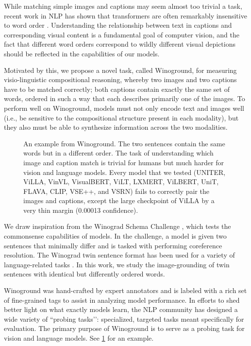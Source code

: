 \documentclass[10pt,twocolumn,letterpaper]{article}
\begin{document}
While matching simple images and captions may seem almost too trivial a task, recent work in NLP has shown that transformers are often remarkably insensitive to word order \cite{sinha2021matterslittle}. Understanding the relationship between text in captions and corresponding visual content is a fundamental goal of computer vision, and the fact that different word orders correspond to wildly different visual depictions should be reflected in the capabilities of our models.

Motivated by this, we propose a novel task, called Winoground, for measuring visio-linguistic compositional reasoning, 
whereby two images and two captions have to be matched correctly; both captions contain exactly the same set of words, ordered in such a way that each describes primarily one of the images. To perform well on Winoground, models must not only encode text and images well (i.e., be sensitive to the compositional structure present in each modality), but they also must be able to synthesize information across the two modalities.

\begin{figure}[!t]\centering
    \qquad
    \caption{An example from Winoground. The two sentences contain the same words but in a different order. The task of understanding which image and caption match is trivial for humans but much harder for vision and language models. Every model that we tested (UNITER, ViLLA, VinVL, VisualBERT, ViLT, LXMERT, ViLBERT, UniT, FLAVA, CLIP, VSE++, and VSRN) fails to correctly pair the images and captions, except the large checkpoint of ViLLA by a very thin margin (0.00013 confidence).}\label{fig:teaser-ex}\end{figure}

We draw inspiration from the Winograd Schema Challenge \cite{levesque2012winograd}, which tests the commonsense capabilities of models. In the challenge, a model is given two sentences that minimally differ and is tasked with performing coreference resolution. The Winograd twin sentence format has been used for a variety of language-related tasks \cite{rudinger2018gender, zhao2018gender, sakaguchi2020winogrande}.
In this work, we study the image-grounding of twin sentences with identical but differently ordered words.

Winoground was hand-crafted by expert annotators and is labeled with a rich set of fine-grained tags to assist in analyzing model performance. In efforts to shed better light on what exactly models learn, the NLP community has designed a wide variety of ``probing tasks’’: specialized, targeted tasks meant specifically for evaluation. The primary purpose of Winoground is to serve as a probing task for vision and language models. See \cref{fig:teaser-ex} for an example.
\end{document}

